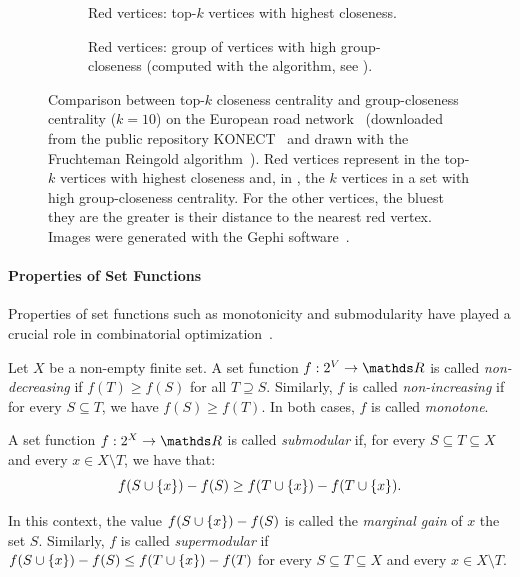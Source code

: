 \begin{figure}[t!]
\centering
\begin{subfigure}[t]{.48\textwidth}
\centering

\caption{Red vertices: top-$k$ vertices with highest closeness.}
\label{fig:prelim:top-k-cc}
\end{subfigure}\hfill
\begin{subfigure}[t]{.48\textwidth}
\centering

\caption{Red vertices: group of vertices with high
group-closeness (computed with the \growshrink algorithm, see
).}
\label{fig:prelim:group-cc}
\end{subfigure}
\caption{Comparison between top-$k$ closeness centrality and group-closeness centrality
($k = 10$) on the European road network~\cite{DBLP:journals/corr/abs-1106-5524}
(downloaded from the public repository KONECT~\cite{kunegis2013konect} and
drawn with the Fruchteman Reingold algorithm~\cite{DBLP:journals/spe/FruchtermanR91}).
Red vertices represent in  the top-$k$ vertices
with highest closeness and, in , the $k$ vertices in
a set with high group-closeness centrality. For the other vertices, the
bluest they are the greater is their distance to the nearest red vertex.
Images were generated with the Gephi software~\cite{DBLP:conf/icwsm/BastianHJ09}.}
\label{fig:prelim:topk-vs-group}
\end{figure}

\paragraph{Properties of Set Functions}
Properties of set functions such as monotonicity and submodularity have played
a crucial role in combinatorial
optimization~\cite{DBLP:journals/siamcomp/FeigeMV11,DBLP:conf/focs/Vondrak09,
DBLP:conf/ismp/Lovasz82,DBLP:journals/mp/NemhauserWF78}.

\begin{definition}[Monotonicity]
\label{def:perlim:monotonicity}
Let $X$ be a non-empty finite set.
A set function $f : 2^V \to \real$ is called
\emph{non-decreasing} if $f(T) \ge f(S)$ for all $T \supseteq S$.
Similarly, $f$ is called \emph{non-increasing} if for every
$S \subseteq T$, we have $f(S) \ge f(T)$.
In both cases, $f$ is called \emph{monotone}.
\end{definition}

\begin{definition}
\label{def:perlim:submodularity}
A set function $f : 2^X \to \real$ is called
\emph{submodular} if, for every $S \subseteq T \subseteq X$ and every $x \in X
\setminus T$, we have that:
%
\[
f(S \cup \set{x}) - f(S) \ge f(T \cup \set{x}) - f(T \cup \set{x}).
\]

In this context, the value $f(S \cup \set{x}) - f(S)$ is
called the \emph{marginal gain} of $x$ \wrt the set $S$.
%
Similarly, $f$ is called \emph{supermodular} if $f(S \cup \set{x}) - f(S) \le
f(T \cup \set{x}) - f(T)$ for every $S \subseteq T \subseteq X$ and
every $x \in X \setminus T$.
\end{definition}

